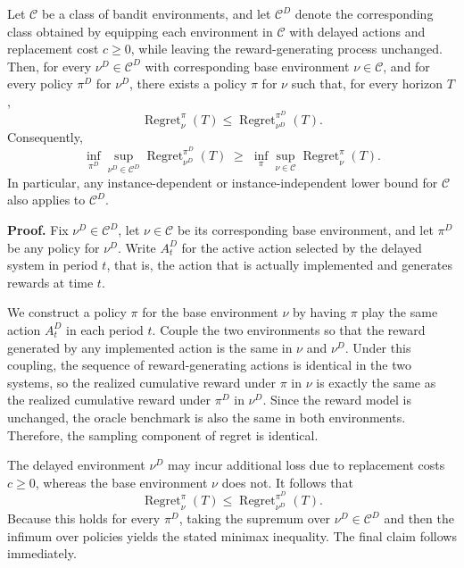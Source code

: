 \documentclass[opre,blindrev]{informs3}
\newcommand{\Regret}{\operatorname{Regret}}
\begin{document}
\begin{APPENDICES}
\begin{lemma}
\label{lem:reduction-lower-bound}
    Let \(\mathcal{C}\) be a class of bandit environments, and let \(\mathcal{C}^D\) denote the corresponding class obtained by equipping each environment in \(\mathcal{C}\) with delayed actions and replacement cost \(c\ge 0\), while leaving the reward-generating process unchanged. Then, for every \(\nu^D \in \mathcal{C}^D\) with corresponding base environment \(\nu \in \mathcal{C}\), and for every policy \(\pi^D\) for \(\nu^D\), there exists a policy \(\pi\) for \(\nu\) such that, for every horizon \(T\),
    \[
        \Regret_{\nu}^{\pi}(T)\le \Regret_{\nu^D}^{\pi^D}(T).
    \]
    Consequently,
    \[
        \inf_{\pi^D}\sup_{\nu^D\in \mathcal{C}^D}\Regret_{\nu^D}^{\pi^D}(T)
        \;\ge\;
        \inf_{\pi}\sup_{\nu\in \mathcal{C}}\Regret_{\nu}^{\pi}(T).
    \]
    In particular, any instance-dependent or instance-independent lower bound for \(\mathcal{C}\) also applies to \(\mathcal{C}^D\).
\end{lemma}

{\bf Proof.}
    Fix \(\nu^D\in\mathcal{C}^D\), let \(\nu\in\mathcal{C}\) be its corresponding base environment, and let \(\pi^D\) be any policy for \(\nu^D\). Write \(A_t^D\) for the active action selected by the delayed system in period \(t\), that is, the action that is actually implemented and generates rewards at time \(t\).
    
    We construct a policy \(\pi\) for the base environment \(\nu\) by having \(\pi\) play the same action \(A_t^D\) in each period \(t\). Couple the two environments so that the reward generated by any implemented action is the same in \(\nu\) and \(\nu^D\). Under this coupling, the sequence of reward-generating actions is identical in the two systems, so the realized cumulative reward under \(\pi\) in \(\nu\) is exactly the same as the realized cumulative reward under \(\pi^D\) in \(\nu^D\). Since the reward model is unchanged, the oracle benchmark is also the same in both environments. Therefore, the sampling component of regret is identical.
    
    The delayed environment \(\nu^D\) may incur additional loss due to replacement costs \(c\geq 0\), whereas the base environment \(\nu\) does not. It follows that
    \[
        \Regret_{\nu}^{\pi}(T)\le \Regret_{\nu^D}^{\pi^D}(T).
    \]
    Because this holds for every \(\pi^D\), taking the supremum over \(\nu^D\in\mathcal{C}^D\) and then the infimum over policies yields the stated minimax inequality. The final claim follows immediately. \Halmos


\end{APPENDICES}
\end{document}
